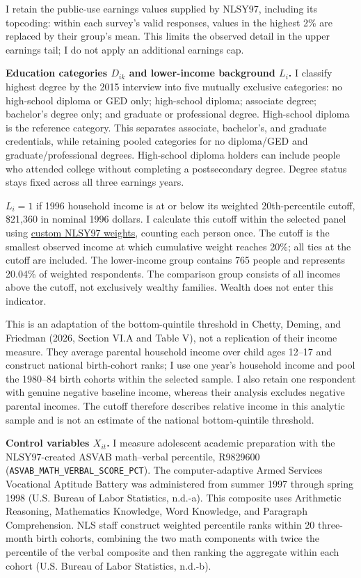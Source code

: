 \documentclass[12pt,letterpaper]{article}
\begin{document}
I retain the public-use earnings values supplied by NLSY97, including its
topcoding: within each survey's valid responses, values in the highest 2\% are
replaced by their group's mean. This limits the observed detail in the upper
earnings tail; I do not apply an additional earnings cap.

\textbf{Education categories $D_{ik}$ and lower-income background $L_i$.}
I classify highest degree by the 2015 interview into five mutually exclusive
categories: no high-school diploma or GED only; high-school diploma; associate
degree; bachelor's degree only; and graduate or professional degree. High-school
diploma is the reference category. This separates associate, bachelor's, and
graduate credentials, while retaining pooled categories for no diploma/GED and
graduate/professional degrees. High-school diploma holders can include people who
attended college without completing a postsecondary degree. Degree status stays
fixed across all three earnings years.

$L_i=1$ if 1996 household income is at or below its weighted 20th-percentile cutoff,
\$21,360 in nominal 1996 dollars. I calculate this cutoff within the selected panel using
\href{https://www.nlsinfo.org/content/weights/nlsy97}{custom NLSY97 weights}, counting
each person once. The cutoff is the smallest observed income at which cumulative
weight reaches 20\%; all ties at the cutoff are included. The lower-income group
contains 765 people and represents 20.04\% of weighted respondents. The comparison
group consists of all incomes above the cutoff, not exclusively wealthy families.
Wealth does not enter this indicator.

This is an adaptation of the bottom-quintile threshold in Chetty, Deming, and
Friedman (2026, Section VI.A and Table V), not a replication of their income measure.
They average parental household income over child ages 12--17 and construct
national birth-cohort ranks; I use one year's household income and pool the
1980--84 birth cohorts within the selected sample. I also retain one respondent
with genuine negative baseline income, whereas their analysis excludes negative
parental incomes. The cutoff therefore describes relative income in this analytic
sample and is not an estimate of the national bottom-quintile threshold.

\textbf{Control variables $X_{it}$.}
I measure adolescent academic preparation with the NLSY97-created ASVAB
math--verbal percentile, R9829600
(\texttt{ASVAB\_MATH\_VERBAL\_SCORE\_PCT}). The computer-adaptive Armed Services
Vocational Aptitude Battery was administered from summer 1997 through spring
1998 (U.S. Bureau of Labor Statistics, n.d.-a). This composite uses Arithmetic
Reasoning, Mathematics Knowledge, Word Knowledge, and Paragraph Comprehension.
NLS staff construct weighted percentile ranks within 20 three-month birth cohorts,
combining the two math components with twice the percentile of the verbal
composite and then ranking the aggregate within each cohort (U.S. Bureau of
Labor Statistics, n.d.-b).
\end{document}

